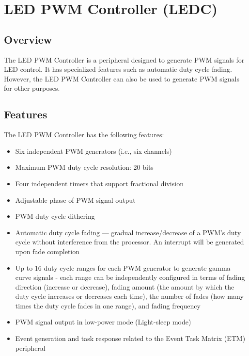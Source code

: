 \documentclass[main\_\_EN.tex]{subfiles}
\begin{document}

\ifglobal
\else
    {\let\clearpage\relax \listoftodos}
    {\let\clearpage\relax \listofdonetodos}
    \tableofcontents
\fi




\hypertarget{ledpwm}{}
\chapter{LED PWM Controller (LEDC)}
\label{mod:ledpwm}

\section{Overview}

The LED PWM Controller is a peripheral designed to generate PWM signals for LED control. It has specialized features such as automatic duty cycle fading. However, the LED PWM Controller can also be used to generate PWM signals for other purposes.

\section{Features}
The LED PWM Controller has the following features:
\begin{itemize}
    \item Six independent PWM generators (i.e., six channels)
    \item Maximum PWM duty cycle resolution: 20 bits
    \item Four independent timers that support fractional division
    \item Adjustable phase of PWM signal output
    \item PWM duty cycle dithering
    \item Automatic duty cycle fading — gradual increase/decrease of a PWM's duty cycle without interference from the processor. An interrupt will be generated upon fade completion
    \item Up to 16 duty cycle ranges for each PWM generator to generate gamma curve signals - each range can be independently configured in terms of fading direction (increase or decrease), fading amount (the amount by which the duty cycle increases or decreases each time), the number of fades (how many times the duty cycle fades in one range), and fading frequency
    \item PWM signal output in low-power mode (Light-sleep mode)
    \item Event generation and task response related to the Event Task Matrix (ETM) peripheral
\end{itemize}
\end{document}

